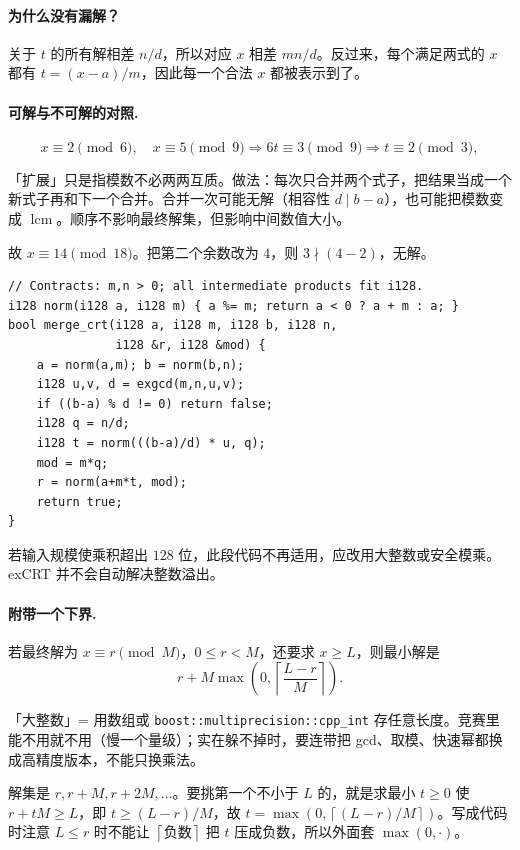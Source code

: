 \documentclass[UTF8,a4paper,11pt,oneside,openany,fontset=fandol]{ctexbook}
\theoremstyle{definition}
\newcommand{\lcm}{\operatorname{lcm}}
\newcommand{\ceil}[1]{\left\lceil #1\right\rceil}
\begin{document}
\paragraph{为什么没有漏解？}
关于 $t$ 的所有解相差 $n/d$，所以对应 $x$ 相差 $mn/d$。反过来，每个满足两式的 $x$ 都有 $t=(x-a)/m$，因此每一个合法 $x$ 都被表示到了。
\paragraph{可解与不可解的对照.}
\[
 x\equiv2\pmod6,\quad x\equiv5\pmod9
 \Longrightarrow 6t\equiv3\pmod9
 \Longrightarrow t\equiv2\pmod3,
\]

\begin{tip}
「扩展」只是指模数不必两两互质。做法：每次只合并两个式子，把结果当成一个新式子再和下一个合并。合并一次可能无解（相容性 $d\mid b-a$），也可能把模数变成 $\lcm$。顺序不影响最终解集，但影响中间数值大小。
\end{tip}

故 $x\equiv14\pmod{18}$。把第二个余数改为 $4$，则 $3\nmid(4-2)$，无解。

\begin{lstlisting}
// Contracts: m,n > 0; all intermediate products fit i128.
i128 norm(i128 a, i128 m) { a %= m; return a < 0 ? a + m : a; }
bool merge_crt(i128 a, i128 m, i128 b, i128 n,
               i128 &r, i128 &mod) {
    a = norm(a,m); b = norm(b,n);
    i128 u,v, d = exgcd(m,n,u,v);
    if ((b-a) % d != 0) return false;
    i128 q = n/d;
    i128 t = norm(((b-a)/d) * u, q);
    mod = m*q;
    r = norm(a+m*t, mod);
    return true;
}
\end{lstlisting}
若输入规模使乘积超出 $128$ 位，此段代码不再适用，应改用大整数或安全模乘。exCRT 并不会自动解决整数溢出。

\paragraph{附带一个下界.} 若最终解为 $x\equiv r\pmod M$，$0\le r<M$，还要求 $x\ge L$，则最小解是
\[
 r+M\max\!\left(0,\ceil{\frac{L-r}{M}}\right).
\]

\begin{tip}
「大整数」= 用数组或 \texttt{boost::multiprecision::cpp\_int} 存任意长度。竞赛里能不用就不用（慢一个量级）；实在躲不掉时，要连带把 gcd、取模、快速幂都换成高精度版本，不能只换乘法。
\end{tip}

\begin{tip}[下界公式是怎么推出来的]
解集是 $r,r+M,r+2M,\ldots$。要挑第一个不小于 $L$ 的，就是求最小 $t\ge0$ 使 $r+tM\ge L$，即 $t\ge(L-r)/M$，故 $t=\max(0,\ceil{(L-r)/M})$。写成代码时注意 $L\le r$ 时不能让 $\ceil{\text{负数}}$ 把 $t$ 压成负数，所以外面套 $\max(0,\cdot)$。
\end{tip}
\end{document}
